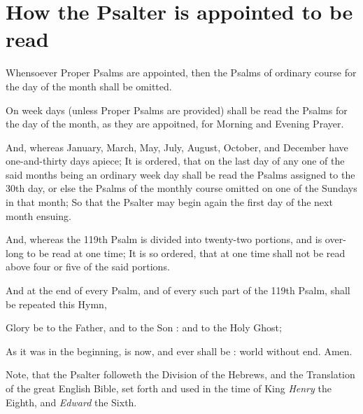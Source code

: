 \section{How the Psalter is appointed to be read}

{\scriptsize

Whensoever Proper Psalms are appointed, then the Psalms of
ordinary course for the day of the month shall be omitted.

On week days (unless Proper Psalms are provided) shall be read the
Psalms for the day of the month, as they are appoitned, for
Morning and Evening Prayer.

And, whereas January, March, May, July, August, October, and
December have one-and-thirty days apiece; It is ordered, that on
the last day of any one of the said months being an ordinary week
day shall be read the Psalms assigned to the 30th day, or else
the Psalms of the monthly course omitted on one of the Sundays in
that month; So that the Psalter may begin again the first day of
the next month ensuing.

And, whereas the 119th Psalm is divided into twenty-two portions,
and is over-long to be read at one time; It is so ordered, that
at one time shall not be read above four or five of the said
portions.

And at the end of every Psalm, and of every such part of the
119th Psalm, shall be repeated this Hymn,


{\normalsize
Glory be to the Father, and to the Son : and to the Holy Ghost;

As it was in the beginning, is now, and ever shall be : world without end. Amen.
}


Note, that the Psalter followeth the Division of the Hebrews, and
the Translation of the great English Bible, set forth and used in
the time of King \emph{Henry} the Eighth, and \emph{Edward} the Sixth.


}
\medskip
